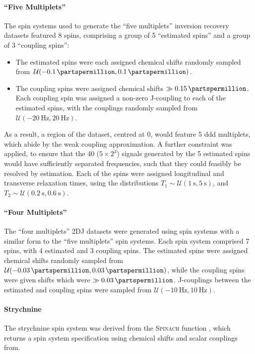 \paragraph{``Five Multiplets''}
The spin systems used to generate the ``five multiplets'' inversion recovery
datasets featured 8 spins, comprising a group of 5 ``estimated spins'' and a
group of 3 ``coupling spins'':
\begin{itemize}
    \item The estimated spins were each assigned chemical shifts randomly
        sampled from \,$\mathcal{U}(\qty{-0.1}{\partspermillion},
        \qty{0.1}{\partspermillion})$.
    \item The coupling spins were assigned chemical shifts $\gg
        \qty{0.15}{\partspermillion}$. Each coupling spin was assigned a
        non-zero J-coupling to each of the estimated spins, with the couplings
        randomly sampled from \,$\mathcal{U}(\qty{-20}{\hertz},
        \qty{20}{\hertz})$.
\end{itemize}
As a result, a region of the dataset, centred at \qty{0}{\partspermillion},
would feature 5 ddd multiplets, which abide by the weak coupling approximation.
A further constraint was applied, to ensure that the 40 ($5 \times 2^3$) signals
generated by the 5 estimated spins would have sufficiently separated
frequencies, such that they could feasibly be resolved by estimation.
Each of the spins were assigned longitudinal and transverse relaxation times,
using the distributions
$T_1 \sim \mathcal{U}(\qty{1}{\second}, \qty{5}{\second})$, and
$T_2 \sim \mathcal{U}(\qty{0.2}{\second}, \qty{0.6}{\second})$.

\paragraph{``Four Multiplets''}
The ``four multiplets'' \ac{2DJ} datasets were generated using spin systems
with a similar form to the ``five multiplets'' spin systems. Each spin system
comprised 7 spins, with 4 estimated and 3 coupling spins. The estimated spins
were assigned chemical shifts randomly sampled from
$\mathcal{U}(-\qty{0.03}{\partspermillion}, \qty{0.03}{\partspermillion})$,
while the coupling spins were given shifts which were $\gg
\qty{0.03}{\partspermillion}$. J-couplings between the estimated and coupling
spins were sampled from $\mathcal{U}(\qty{-10}{\hertz}, \qty{10}{\hertz})$.

\paragraph{Strychnine}
The strychnine spin system was derived from
the \textsc{Spinach} function , which returns a
spin system specification using chemical shifts and scalar couplings
from\cite[Appendix 5]{Berger2004}.

